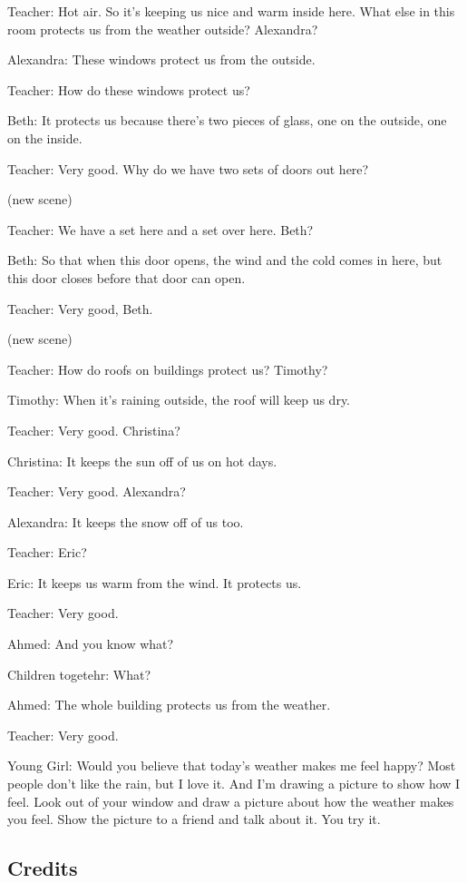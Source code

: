 Teacher: Hot air. So it's keeping us nice and warm inside here. What else in this room protects us from the weather outside? Alexandra?

Alexandra: These windows protect us from the outside.

Teacher: How do these windows protect us?

Beth: It protects us because there's two pieces of glass, one on the outside, one on the inside.

Teacher: Very good. Why do we have two sets of doors out here?

(new scene)

Teacher: We have a set here and a set over here. Beth?

Beth: So that when this door opens, the wind and the cold comes in here, but this door closes before that door can open.

Teacher: Very good, Beth.

(new scene)

Teacher: How do roofs on buildings protect us? Timothy?

Timothy: When it's raining outside, the roof will keep us dry.

Teacher: Very good. Christina?

Christina: It keeps the sun off of us on hot days.

Teacher: Very good. Alexandra?

Alexandra: It keeps the snow off of us too.

Teacher: Eric?

Eric: It keeps us warm from the wind. It protects us.

Teacher: Very good.

Ahmed: And you know what?

Children togetehr: What?

Ahmed: The whole building protects us from the weather.

Teacher: Very good.

Young Girl: Would you believe that today's weather makes me feel happy? Most people don't like the rain, but I love it. And I'm drawing a picture to show how I feel. Look out of your window and draw a picture about how the weather makes you feel. Show the picture to a friend and talk about it. You try it.

\subsection{Credits}

